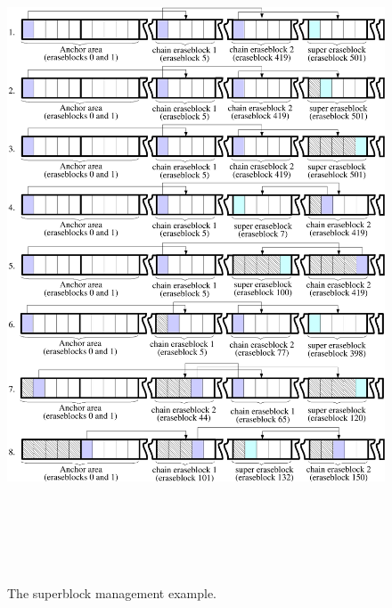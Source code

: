 \begin{figure}[!t]
\begin{center}
\includegraphics[width=159mm,height=200mm]{pics/sb-02.pdf}
\end{center}
\caption{The superblock management example.}
\label{ref_FigureSB_02}
\end{figure}

